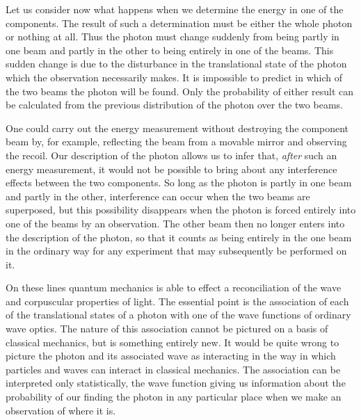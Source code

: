 Let us consider now what happens when we determine the energy in one of the components.  The result of such a determination must be either the whole photon or nothing at all.  Thus the photon must change suddenly from being partly in one beam and partly in the other to being entirely in one of the beams.  This sudden change is due to the disturbance in the translational state of the photon which the observation necessarily makes.  It is impossible to predict in which of the two beams the photon will be found.  Only the probability of either result can be calculated from the previous distribution of the photon over the two beams.

One could carry out the energy measurement without destroying the component beam by, for example, reflecting the beam from a movable mirror and observing the recoil.  Our description of the photon allows us to infer that, \emph{after} such an energy measurement, it would not be possible to bring about any interference effects between the two components.  So long as the photon is partly in one beam and partly in the other, interference can occur when the two beams are superposed, but this possibility disappears when the photon is forced entirely into one of the beams by an observation.  The other beam then no longer enters into the description of the photon, so that it counts as being entirely in the one beam in the ordinary way for any experiment that may subsequently be performed on it.

On these lines quantum mechanics is able to effect a reconciliation of the wave and corpuscular properties of light.  The essential point is the association of each of the translational states of a photon with one of the wave functions of ordinary wave optics.  The nature of this association cannot be pictured on a basis of classical mechanics, but is something entirely new.  It would be quite wrong to picture the photon and its associated wave as interacting in the way in which particles and waves can interact in classical mechanics.  The association can be interpreted only statistically, the wave function giving us information about the probability of our finding the photon in any particular place when we make an observation of where it is.

